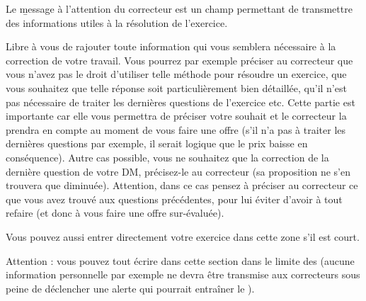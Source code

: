 Le \b{message à l'attention du correcteur} est un champ permettant de transmettre des informations utiles à la résolution de l'exercice.

Libre à vous de rajouter toute information qui vous semblera nécessaire à la correction de votre travail. Vous pourrez par exemple préciser au correcteur que vous n'avez pas le droit d'utiliser telle méthode pour résoudre un exercice, que vous souhaitez que telle réponse soit particulièrement bien détaillée, qu'il n'est pas nécessaire de traiter les dernières questions de l'exercice etc. Cette partie est importante car elle vous permettra de préciser votre souhait et le correcteur la prendra en compte au moment de vous faire une offre (s'il n'a pas à traiter les dernières questions par exemple, il serait logique que le prix baisse en conséquence). Autre cas possible, vous ne souhaitez que la correction de la dernière question de votre DM, précisez-le au correcteur (sa proposition ne s'en trouvera que diminuée). Attention, dans ce cas pensez à préciser au correcteur ce que vous avez trouvé aux questions précédentes, pour lui éviter d'avoir à tout refaire (et donc à vous faire une offre sur-évaluée).

Vous pouvez aussi entrer directement votre exercice dans cette zone s'il est court.

Attention : vous pouvez tout écrire dans cette section dans le limite des  (aucune information personnelle par exemple ne devra être transmise aux correcteurs sous peine de déclencher une alerte qui pourrait entraîner le ).